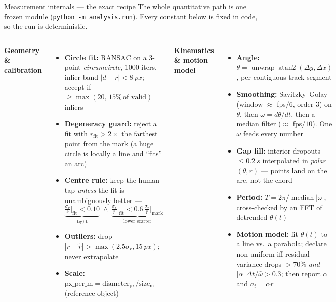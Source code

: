 \documentclass[aspectratio=169,10pt]{beamer}
\begin{document}
\begin{frame}{Measurement internals --- the exact recipe}
\scriptsize
The whole quantitative path is one frozen module (\texttt{python -m analysis.run}). Every constant below is fixed in code, so the run is deterministic.
\vspace{0.2em}
\begin{columns}[T]
\textbf{\color{cMeas}Geometry \& calibration}
\begin{itemize}\setlength\itemsep{1.5pt}
  \item \textbf{Circle fit:} RANSAC on a 3-point \emph{circumcircle}, 1000 iters, inlier band $|d-r|<\SI{8}{px}$; accept if $\ge\max(20,\,15\%\,\text{of valid})$ inliers
  \item \textbf{Degeneracy guard:} reject a fit with $r_{\text{fit}}>2\times$ the farthest point from the mark (a huge circle is locally a line and ``fits'' an arc)
  \item \textbf{Centre rule:} keep the human tap \emph{unless} the fit is unambiguously better ---
  \[\underbrace{\tfrac{\sigma_r}{\bar r}\Big|_{\text{fit}}<0.10}_{\text{tight}}\;\wedge\;\underbrace{\tfrac{\sigma_r}{\bar r}\Big|_{\text{fit}}<0.6\,\tfrac{\sigma_r}{\bar r}\Big|_{\text{mark}}}_{\text{lower scatter}}\]
  \item \textbf{Outliers:} drop $|r-\tilde r|>\max(2.5\sigma_r,\SI{15}{px})$; never extrapolate
  \item \textbf{Scale:} $\text{px\_per\_m}=\text{diameter}_\text{px}/\text{size}_\text{m}$ (reference object)
\end{itemize}
\textbf{\color{cMeas}Kinematics \& motion model}
\begin{itemize}\setlength\itemsep{1.5pt}
  \item \textbf{Angle:} $\theta=\operatorname{unwrap}\operatorname{atan2}(\Delta y,\Delta x)$, per contiguous track segment
  \item \textbf{Smoothing:} Savitzky--Golay (window $\approx$ fps$/6$, order 3) on $\theta$, then $\omega=d\theta/dt$, then a median filter ($\approx$ fps$/10$). \alert{One} $\omega$ feeds every number
  \item \textbf{Gap fill:} interior dropouts $\le\SI{0.2}{s}$ interpolated in \emph{polar} $(\theta,r)$ --- points land on the arc, not the chord
  \item \textbf{Period:} $T=2\pi/\operatorname{median}|\omega|$, cross-checked by an FFT of detrended $\theta(t)$
  \item \textbf{Motion model:} fit $\theta(t)$ to a line vs.\ a parabola; declare non-uniform iff residual variance drops $>70\%$ \emph{and} $|\alpha|\,\Delta t/\bar\omega>0.3$; then report $\alpha$ and $a_t=\alpha r$
\end{itemize}
\end{columns}
\end{frame}
\end{document}
